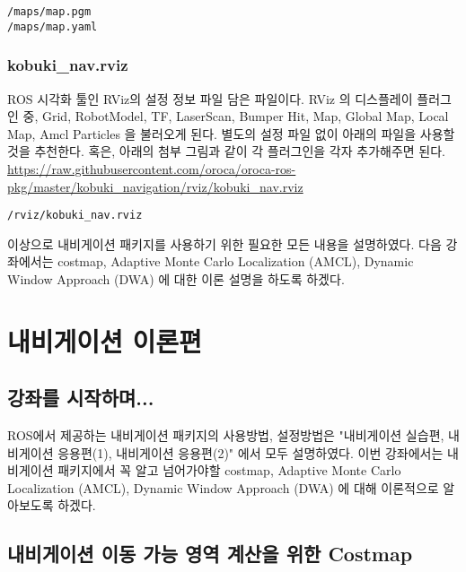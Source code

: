 \vspace{\baselineskip}
\begin{lstlisting}[language=ROS]
/maps/map.pgm
/maps/map.yaml
\end{lstlisting}

\subsubsection{kobuki\_nav.rviz}
ROS 시각화 툴인 RViz의 설정 정보 파일 담은 파일이다. RViz 의 디스플레이 플러그인 중, Grid, RobotModel, TF, LaserScan, Bumper Hit, Map, Global Map, Local Map, Amcl Particles 을 불러오게 된다. 별도의 설정 파일 없이 아래의 파일을 사용할 것을 추천한다. 혹은, 아래의 첨부 그림과 같이 각 플러그인을 각자 추가해주면 된다.\\

\url{https://raw.githubusercontent.com/oroca/oroca-ros-pkg/master/kobuki_navigation/rviz/kobuki_nav.rviz}

\vspace{\baselineskip}
\begin{lstlisting}[language=ROS]
/rviz/kobuki_nav.rviz
\end{lstlisting}

이상으로 내비게이션 패키지를 사용하기 위한 필요한 모든 내용을 설명하였다. 다음 강좌에서는 costmap, Adaptive Monte Carlo Localization (AMCL), Dynamic Window Approach (DWA) 에 대한 이론 설명을 하도록 하겠다.


\section{내비게이션 이론편}

\subsection{강좌를 시작하며...}

ROS에서 제공하는 내비게이션 패키지의 사용방법, 설정방법은 "내비게이션 실습편, 내비게이션 응용편(1), 내비게이션 응용편(2)" 에서 모두 설명하였다. 이번 강좌에서는 내비게이션 패키지에서 꼭 알고 넘어가야할 costmap, Adaptive Monte Carlo Localization (AMCL), Dynamic Window Approach (DWA) 에 대해 이론적으로 알아보도록 하겠다.

\subsection{내비게이션 이동 가능 영역 계산을 위한 Costmap}

